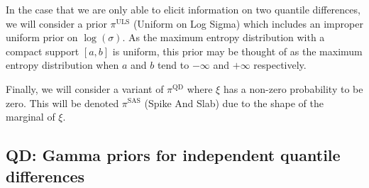 \documentclass{article}
\begin{document}
%
In the case that we are only able to elicit information on two quantile differences,
we will consider a prior $\pi^{\text{ULS}}$ (Uniform on Log Sigma) which includes an improper uniform prior on $\log(\sigma)$.
As the maximum entropy distribution with a compact support $[a, b]$ is uniform,
this prior may be thought of as the maximum entropy distribution
when $a$ and $b$ tend to $-\infty$ and $+\infty$ respectively.
%

%
Finally, we will consider a variant of $\pi^{\text{QD}}$ where $\xi$ has a non-zero probability to be zero. This will be denoted $\pi^{\text{SAS}}$ (Spike And Slab) due to the shape of the marginal of $\xi$.
%
\subsection{QD:
	Gamma priors for independent quantile differences}
%
\end{document}
